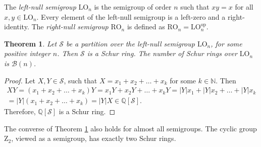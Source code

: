 \documentclass{article}
\theoremstyle{plain}
\newtheorem{Thm}{Theorem}[section]
\theoremstyle{definition}
\newcommand{\thmref}[1]{Theorem \ref{#1}}
\renewcommand{\S}{\mathcal{S}}
\newcommand{\Q}{\mathbb{Q}}
\newcommand{\N}{\mathbb{N}}
\newcommand{\QS}{\Q[\S]}
\newcommand{\B}{\mathscr{B}}
\newcommand{\LO}{\mathrm{LO}}
\newcommand{\RO}{\mathrm{RO}}
\newcommand{\z}{\mathrm{Z}}
\begin{document}
The \label{lnull}\emph{left-null semigroup} $\LO_n$ is the semigroup of order $n$ such that $xy=x$ for all $x,y\in \LO_n$. Every element of the left-null semigroup is a left-zero and a right-identity. The \label{rnull}\emph{right-null semigroup} $\RO_n$ is defined as $\RO_n = \LO_n^\text{op}$.

\begin{Thm}\label{thm:leftnullschur} Let $\S$ be a partition over the left-null semigroup $\LO_n$, for some positive integer $n$. Then $\S$ is a Schur ring. The number of Schur rings over $\LO_n$ is $\B(n)$.
\end{Thm}
\begin{proof}
Let $X,Y\in \S$, such that $X=x_1+x_2+\ldots+x_k$ for some $k\in \N$. Then
\begin{multline*}
    XY = (x_1+x_2+\ldots+x_k)Y = x_1Y+x_2Y+\ldots+x_kY = |Y|x_1+|Y|x_2+\ldots+|Y|x_k\\ 
    = |Y|(x_1+x_2+\ldots+x_k) = |Y|X\in \QS.
\end{multline*}  Therefore, $\QS$ is a Schur ring.
\end{proof}

The converse of \thmref{thm:leftnullschur} also holds for almost all semigroups. The cyclic group $\z_2$, viewed as a semigroup, has exactly two Schur rings.%
\end{document}
